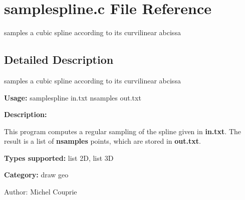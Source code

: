 \section{samplespline.c File Reference}
\label{samplespline_8c}
samples a cubic spline according to its curvilinear abcissa 



\subsection{Detailed Description}
samples a cubic spline according to its curvilinear abcissa 

{\bf Usage:} samplespline in.txt nsamples out.txt

{\bf Description:}

This program computes a regular sampling of the spline given in {\bf in.txt}. The result is a list of {\bf nsamples} points, which are stored in {\bf out.txt}.

{\bf Types supported:} list 2D, list 3D

{\bf Category:} draw geo

\begin{Desc}
\item[Author:]Michel Couprie \end{Desc}
